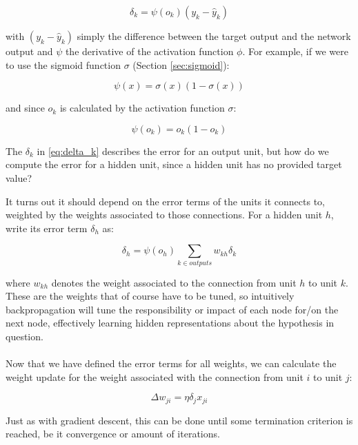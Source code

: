 \begin{equation}
  \delta_k = \psi(o_k) (y_k - \hat{y}_k)
  \label{eq:delta_k}
\end{equation}

with $(y_k - \hat{y}_k)$
simply the difference between the target output and the network output
and $\psi$ the derivative of the activation function $\phi$.
For example, if we were to use
the sigmoid function $\sigma$ (Section \ref{sec:sigmoid}):

\begin{equation}
  \psi(x) = \sigma(x) (1 - \sigma(x))
\end{equation}

and since $o_k$ is calculated by the activation function $\sigma$:

\begin{equation}
  \psi(o_k) = o_k (1 - o_k)
\end{equation}

The $\delta_k$ in \ref{eq:delta_k}
describes the error for an output unit,
but how do we compute the error for a hidden unit,
since a hidden unit has no provided target value?

It turns out it should depend on the error terms
of the units it connects to,
weighted by the weights associated to those connections.
For a hidden unit $h$, write its error term $\delta_h$ as:

\begin{equation}
  \delta_h = \psi(o_h) \sum_{k \in outputs} w_{kh}\delta_k
\end{equation}

where $w_{kh}$ denotes the weight associated to
the connection from unit $h$ to unit $k$.
These are the weights that of course have to be tuned,
so intuitively backpropagation will tune
the responsibility or impact of each node for/on the next node,
effectively learning hidden representations about the hypothesis in question.

\paragraph{}
Now that we have defined the error terms for all weights,
we can calculate the weight update
for the weight associated with the connection
from unit $i$ to unit $j$:

\begin{equation}
  \Delta w_{ji} = \eta \delta_j x_{ji}
\end{equation}

Just as with gradient descent,
this can be done until some termination criterion is reached,
be it convergence or amount of iterations.

